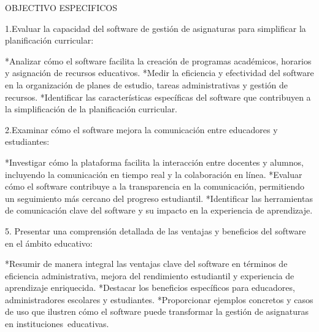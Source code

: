 OBJECTIVO ESPECIFICOS 

1.Evaluar la capacidad del software de gestión de asignaturas para simplificar la planificación curricular:

*Analizar cómo el software facilita la creación de programas académicos, horarios y asignación de recursos educativos.
*Medir la eficiencia y efectividad del software en la organización de planes de estudio, tareas administrativas y gestión de recursos.
*Identificar las características específicas del software que contribuyen a la simplificación de la planificación curricular.

2.Examinar cómo el software mejora la comunicación entre educadores y estudiantes:

*Investigar cómo la plataforma facilita la interacción entre docentes y alumnos, incluyendo la comunicación en tiempo real y la colaboración en línea.
*Evaluar cómo el software contribuye a la transparencia en la comunicación, permitiendo un seguimiento más cercano del progreso estudiantil.
*Identificar las herramientas de comunicación clave del software y su impacto en la experiencia de aprendizaje.

5. Presentar una comprensión detallada de las ventajas y beneficios del software en el ámbito educativo:

*Resumir de manera integral las ventajas clave del software en términos de eficiencia administrativa, mejora del rendimiento estudiantil
y experiencia de aprendizaje enriquecida.
*Destacar los beneficios específicos para educadores, administradores escolares y estudiantes.
*Proporcionar ejemplos concretos y casos de uso que ilustren cómo el software puede transformar la gestión de asignaturas en
instituciones educativas.
